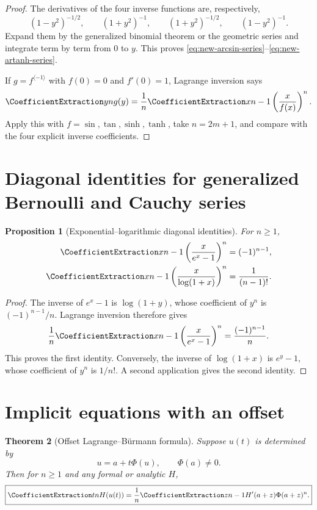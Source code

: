 \documentclass[11pt,a4paper,oneside,openany]{book}
\newtheorem{theorem}{Theorem}[chapter]
\newtheorem{proposition}[theorem]{Proposition}
\theoremstyle{definition}
\theoremstyle{remark}
\begin{document}
\begin{proof}
The derivatives of the four inverse functions are, respectively,
\[
 (1-y^2)^{-1/2},\qquad (1+y^2)^{-1},\qquad
 (1+y^2)^{-1/2},\qquad (1-y^2)^{-1}.
\]
Expand them by the generalized binomial theorem or the geometric series and
integrate term by term from $0$ to $y$.  This proves
\eqref{eq:new-arcsin-series}--\eqref{eq:new-artanh-series}.

If $g=f^{\langle-1\rangle}$ with $f(0)=0$ and $f'(0)=1$, Lagrange inversion
says
\[
 \CoefficientExtraction y n g(y)=\frac1n\CoefficientExtraction x{n-1}
 \left(\frac{x}{f(x)}\right)^n.
\]
Apply this with $f=\sin,\tan,\sinh,\tanh$, take $n=2m+1$, and compare with
the four explicit inverse coefficients.
\end{proof}

\section{Diagonal identities for generalized Bernoulli and Cauchy series}

\begin{proposition}[Exponential--logarithmic diagonal identities]
\label{prop:new-exp-log-diagonals}
For $n\ge1$,
\begin{align}
 \CoefficientExtraction x{n-1}\left(\frac{x}{e^x-1}\right)^n
 &=(-1)^{n-1},
 \label{eq:new-norlund-diagonal}\\
 \CoefficientExtraction x{n-1}\left(\frac{x}{\log(1+x)}\right)^n
 &=\frac1{(n-1)!}.
 \label{eq:new-cauchy-diagonal}
\end{align}
\end{proposition}

\begin{proof}
The inverse of $e^x-1$ is $\log(1+y)$, whose coefficient of $y^n$ is
$(-1)^{n-1}/n$.  Lagrange inversion therefore gives
\[
 \frac1n\CoefficientExtraction x{n-1}\left(\frac{x}{e^x-1}\right)^n
 =\frac{(-1)^{n-1}}n.
\]
This proves the first identity.  Conversely, the inverse of $\log(1+x)$ is
$e^y-1$, whose coefficient of $y^n$ is $1/n!$.  A second application gives
the second identity.
\end{proof}

\section{Implicit equations with an offset}

\begin{theorem}[Offset Lagrange--Bürmann formula]\label{thm:new-offset-lagrange}
Suppose $u(t)$ is determined by
\begin{equation}\label{eq:new-offset-equation}
 u=a+t\Phi(u),\qquad \Phi(a)\ne0.
\end{equation}
Then for $n\ge1$ and any formal or analytic $H$,
\begin{equation}\label{eq:new-offset-lagrange}
 \boxed{\displaystyle
 \CoefficientExtraction t n H(u(t))
 =\frac1n\CoefficientExtraction z{n-1}H'(a+z)\Phi(a+z)^n.}
\end{equation}
\end{theorem}
\end{document}
